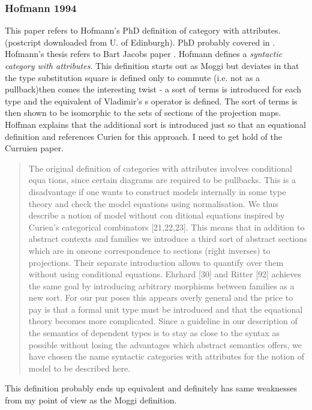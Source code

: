 \documentclass[10pt,a4paper]{article}
\begin{document}
\subsubsection{Hofmann 1994}
This paper refers to Hofmann's PhD definition of category with attributes.
(postcript downloaded from U. of Edinburgh). PhD probably covered in \cite{hofmann94}.
Hofmann's thesis refers to Bart Jacobs paper \cite{jacobs93}.
\noindent
Hofmann defines a \textit{syntactic category with attributes}.
This definition starts out as Moggi but deviates in that the  type substitution square is defined only to commute (i.e. not as a pullback)then comes the interesting twist - 
a sort of terms is introduced for each type and  the equivalent of Vladimir's s operator is defined. The sort of terms is then shown to be isomorphic 
to the sets of sections of the projection maps. Hoffman explains that
the additional sort is introduced just so that an equational definition and references Curien for this approach. I need to get hold of the Curruien paper.
\begin{quote}
The original definition of categories with attributes involves conditional equa­ 
tions, since certain diagrams are required to be pullbacks. This is a disadvantage if 
one wants to construct models internally in some type theory and check the model 
equations using normalisation. We thus describe a notion of model without con­ 
ditional equations inspired by Curien's categorical combinators [21,22,23]. This 
means that in addition to abstract contexts and families we introduce a third sort 
of abstract sections which are in one­one correspondence to sections (right inverses) 
to projections. Their separate introduction allows to quantify over them without 
using conditional equations. Ehrhard [30] and Ritter [92] achieves the same goal 
by introducing arbitrary morphisms between families as a new sort. For our pur­ 
poses this appears overly general and the price to pay is that a formal unit type 
must be introduced and that the equational theory becomes more complicated. 
Since a guideline in our description of the semantics of dependent types is to 
stay as close to the syntax as possible without losing the advantages which abstract 
semantics offers, we have chosen the name syntactic categories with attributes for 
the notion of model to be described here. 
\end{quote}

This definition probably ends up equivalent and definitely 
has same weaknesses from my point of view as the Moggi definition.
\end{document}
